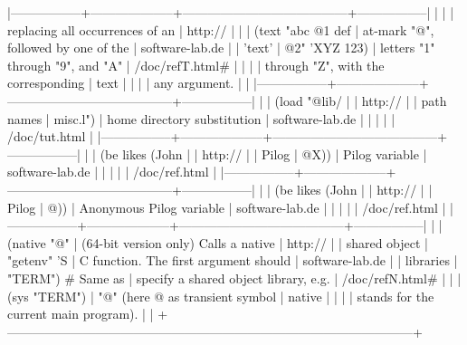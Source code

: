 \begin{wideverbatim}
|-----------------+--------------------+---------------------------------------+-----------------|
|                 |                    | replacing all occurrences of an       | http://         |
|                 | (text "abc @1 def  | at-mark "@", followed by one of the   | software-lab.de |
| 'text'          | @2" 'XYZ 123)      | letters "1" through "9", and "A"      | /doc/refT.html# |
|                 |                    | through "Z", with the corresponding   | text            |
|                 |                    | any argument.                         |                 |
|-----------------+--------------------+---------------------------------------+-----------------|
|                 | (load "@lib/       |                                       | http://         |
| path names      | misc.l")           | home directory substitution           | software-lab.de |
|                 |                    |                                       | /doc/tut.html   |
|-----------------+--------------------+---------------------------------------+-----------------|
|                 | (be likes (John    |                                       | http://         |
| Pilog           | @X))               | Pilog variable                        | software-lab.de |
|                 |                    |                                       | /doc/ref.html   |
|-----------------+--------------------+---------------------------------------+-----------------|
|                 | (be likes (John    |                                       | http://         |
| Pilog           | @))                | Anonymous Pilog variable              | software-lab.de |
|                 |                    |                                       | /doc/ref.html   |
|-----------------+--------------------+---------------------------------------+-----------------|
|                 | (native "@"        | (64-bit version only) Calls a native  | http://         |
| shared object   | "getenv" 'S        | C function. The first argument should | software-lab.de |
| libraries       | "TERM") # Same as  | specify a shared object library, e.g. | /doc/refN.html# |
|                 | (sys "TERM")       | "@" (here @ as transient symbol       | native          |
|                 |                    | stands for the current main program). |                 |
+------------------------------------------------------------------------------------------------+


\end{wideverbatim}

% 

